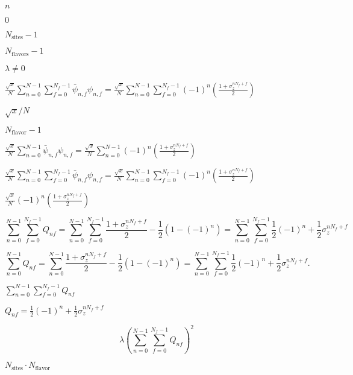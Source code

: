 \documentclass{article}
\begin{document}
{$ n $
\pagebreak

$ 0$
\pagebreak

$ N_\mathrm{sites}-1$
\pagebreak

$ N_\mathrm{flavors}-1$
\pagebreak

$ \lambda\neq 0 $
\pagebreak

$ \frac{\sqrt{x}}{N}\sum_{n=0}^{N-1}\sum_{f=0}^{N_f-1}\bar{\psi}_{n,f}\psi_{n,f}=\frac{\sqrt{x}}{N}\sum_{n=0}^{N-1}\sum_{f=0}^{N_f-1}(-1)^n\left(\frac{1+\sigma_z^{nN_f+f}}{2}\right) $
\pagebreak

$ \sqrt{x}/N$
\pagebreak

$ N_\mathrm{flavor} -1 $
\pagebreak

$ \frac{\sqrt{x}}{N}\sum_{n=0}^{N-1}\bar{\psi}_{n,f}\psi_{n,f}= \frac{\sqrt{x}}{N}\sum_{n=0}^{N-1}(-1)^n\left(\frac{1+\sigma_z^{nN_f+f}}{2}\right)$
\pagebreak

$ \frac{\sqrt{x}}{N}\sum_{n=0}^{N-1}\sum_{f=0}^{N_f-1}\bar{\psi}_{n,f}\psi_{n,f} = \frac{\sqrt{x}}{N}\sum_{n=0}^{N-1}\sum_{f=0}^{N_f-1}(-1)^n\left(\frac{1+\sigma_z^{nN_f+f}}{2}\right) $
\pagebreak

$ \frac{\sqrt{x}}{N}(-1)^n\left(\frac{1+\sigma_z^{nN_f+f}}{2}\right) $
\pagebreak

\[ \sum_{n=0}^{N-1} \sum_{f=0}^{N_f-1} Q_{nf} = \sum_{n=0}^{N-1} \sum_{f=0}^{N_f-1} \frac{1+\sigma_z^{nN_f+f}}{2}-\frac{1}{2}\left(1-(-1)^n\right) = \sum_{n=0}^{N-1} \sum_{f=0}^{N_f-1} \frac{1}{2}\left(-1\right)^n+\frac{1}{2}\sigma_z^{nN_f+f} \]
\pagebreak

\[ \sum_{n=0}^{N-1}  Q_{nf} = \sum_{n=0}^{N-1} \frac{1+\sigma_z^{nN_f+f}}{2}-\frac{1}{2}\left(1-(-1)^n\right) = \sum_{n=0}^{N-1} \sum_{f=0}^{N_f-1} \frac{1}{2}\left(-1\right)^n+\frac{1}{2}\sigma_z^{nN_f+f}. \]
\pagebreak

$ \sum_{n=0}^{N-1} \sum_{f=0}^{N_f-1} Q_{nf} $
\pagebreak

$ Q_{nf} = \frac{1}{2}\left(-1\right)^n+\frac{1}{2}\sigma_z^{nN_f+f} $
\pagebreak

\[ \lambda\left(\sum_{n=0}^{N-1} \sum_{f=0}^{N_f-1} Q_{nf}\right)^2 \]
\pagebreak

$ N_\mathrm{sites}\cdot N_\mathrm{flavor} $
\pagebreak

}
\end{document}
